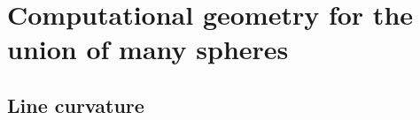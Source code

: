 \documentclass[12pt]{report}
\begin{document}
\chapter{Computational geometry for the union of many spheres}
\section{Line curvature}

\end{document}

